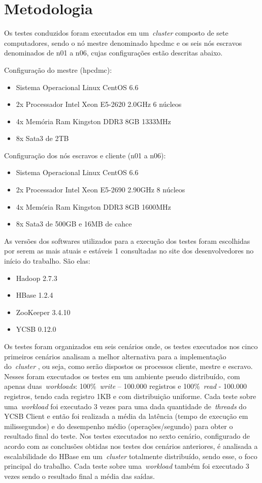 \documentclass[12pt]{article}
\begin{document}
\section{Metodologia}
\label{section:metodologia}

Os testes conduzidos foram executados em um~\emph{cluster}  composto de sete computadores, sendo o nó mestre denominado hpcdmc e os seis nós escravos denominados de n01 a n06, cujas configurações estão descritas abaixo.

Configuração do mestre (hpcdmc):
\begin{itemize}
\item Sistema Operacional Linux CentOS 6.6
\item 2x Processador Intel Xeon E5-2620 2.0GHz 6 núcleos
\item 4x Memória Ram Kingston DDR3 8GB 1333MHz
\item 8x Sata3 de 2TB
\end{itemize}

Configuração dos nós escravos e cliente (n01 a n06):

\begin{itemize}
\item Sistema Operacional Linux CentOS 6.6
\item 2x Processador Intel Xeon E5-2690 2.90GHz 8 núcleos
\item 4x Memória Ram Kingston DDR3 8GB 1600MHz
\item 8x Sata3 de 500GB e 16MB de cahce
\end{itemize}

As versões dos softwares utilizados para a execução dos testes foram escolhidas
por serem as mais atuais e estáveis 1 consultadas no site dos desenvolvedores no início do
trabalho. São elas:

\begin{itemize}
\item Hadoop 2.7.3
\item HBase 1.2.4
\item ZooKeeper 3.4.10
\item YCSB 0.12.0
\end{itemize}

Os testes foram organizados em seis cenários onde, os testes executados nos cinco primeiros cenários analisam a melhor alternativa para a implementação do~\emph{cluster} , ou seja, como serão dispostos os processos cliente, mestre e escravo. 
Nesses foram executados os testes em um ambiente pseudo distribuído, com apenas duas~\emph{workloads}: 100\%~\emph{write} -- 100.000 registros e 100\%~\emph{read} - 100.000 registros, tendo cada registro 1KB e com distribuição uniforme. Cada teste sobre uma~\emph{workload} foi executado 3 vezes para uma dada quantidade de~\emph{threads} do YCSB Client e então foi realizada a média da latência (tempo de execução em milissegundos) e do desempenho médio (operações/segundo) para obter o resultado final do teste.
Nos testes executados no sexto cenário, configurado de acordo com as conclusões obtidas nos testes dos cenários anteriores, é analisada a escalabilidade do HBase em um~\emph{cluster}  totalmente distribuído, sendo esse, o foco principal do trabalho. Cada teste sobre uma~\emph{workload} também foi executado 3 vezes sendo o resultado final a média das saídas.
\end{document}
